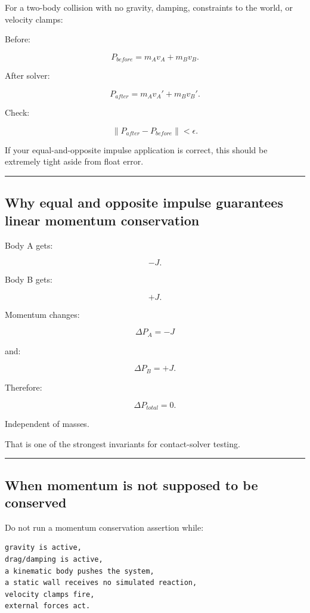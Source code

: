 For a two-body collision with no gravity, damping, constraints to the world, or velocity clamps:

Before:

\[
P_{before}
=
m_Av_A+
m_Bv_B.
\]

After solver:

\[
P_{after}
=
m_Av_A'+
m_Bv_B'.
\]

Check:

\[
\boxed{
\|P_{after}-P_{before}\|
<
\epsilon.
}
\]

If your equal-and-opposite impulse application is correct, this should be extremely tight aside from float error.

\begin{center}\rule{0.5\linewidth}{0.5pt}\end{center}

\subsection{Why equal and opposite impulse guarantees linear momentum conservation}\label{06-engine-ii-ch039-why-equal-and-opposite-impulse-guarantees-linear-momentum-conservation}

Body A gets:

\[
-J.
\]

Body B gets:

\[
+J.
\]

Momentum changes:

\[
\Delta P_A=-J
\]

and:

\[
\Delta P_B=+J.
\]

Therefore:

\[
\Delta P_{total}=0.
\]

Independent of masses.

That is one of the strongest invariants for contact-solver testing.

\begin{center}\rule{0.5\linewidth}{0.5pt}\end{center}

\subsection{When momentum is not supposed to be conserved}\label{06-engine-ii-ch039-when-momentum-is-not-supposed-to-be-conserved}

Do not run a momentum conservation assertion while:

\begin{verbatim}
gravity is active,
drag/damping is active,
a kinematic body pushes the system,
a static wall receives no simulated reaction,
velocity clamps fire,
external forces act.
\end{verbatim}

